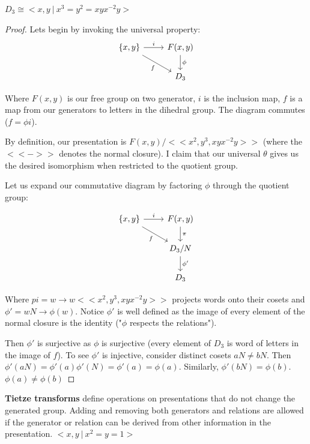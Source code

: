 \documentclass[10pt]{article}
\begin{document}
\begin{proposition}
	$D_3 \cong <x,y~|~x^3=y^2=xyx^{-2}y>$
\end{proposition}

\begin{proof}

	Lets begin by invoking the universal property:
	\[
	\begin{tikzcd}
	{\{x, y\}} \arrow[rd, "f"'] \arrow[r, "i"] & {F(x, y)} \arrow[d, "\phi"] \\
																						 & D_3                        
	\end{tikzcd}
	\]

	Where $F(x, y)$ is our free group on two generator, $i$ is the inclusion map,
	$f$ is a map from our generators to letters in the dihedral group. The
	diagram commutes ($f = \phi i$).

	By definition, our presentation is $F(x, y) / << x^2, y^3, xyx^{-2}y >>$
	(where the $<<->>$ denotes the normal closure). I claim that our universal
	$\theta$ gives us the desired isomorphism when restricted to the quotient
	group.

	Let us expand our commutative diagram by factoring $\phi$ through the
	quotient group:

	\[
	\begin{tikzcd}
	{\{x, y\}} \arrow[rd, "f"'] \arrow[r, "i"] & {F(x, y)} \arrow[d, "\pi"]   \\
																						 & D_3 / N \arrow[d, "\phi'"] \\
																						 & D_3                         
	\end{tikzcd}
	\]

	Where $pi = w \to w << x^2, y^3, xyx^{-2}y >>$ projects words onto
	their cosets and $\phi' = wN \to \phi(w)$. Notice $\phi'$ is well defined as
	the image of every element of the normal closure is the identity ("$\phi$
	respects the relations").

	Then $\phi'$ is surjective as $\phi$ is surjective (every element of $D_3$ is
	word of letters in the image of $f$). To see $\phi'$ is injective, consider
	distinct cosets $aN \neq bN$. Then $\phi'(aN) = \phi'(a)\phi'(N) = \phi'(a) =
	\phi(a)$. Similarly, $\phi'(bN) = \phi(b)$. $\phi(a) \neq \phi(b)$

\end{proof}


\begin{note}
	\textbf{Tietze transforms} define operations on presentations that do not
	change the generated group. Adding and removing both generators and relations
	are allowed if the generator or relation can be derived from other
	information in the presentation.
	$< x, y ~|~ x^2 = y = 1>$
\end{note}
\end{document}
